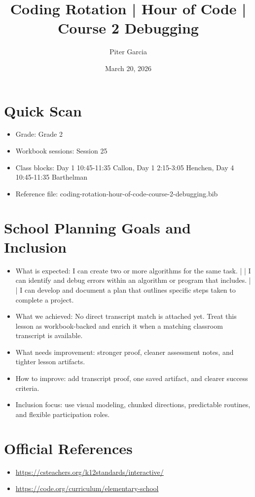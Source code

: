 \documentclass[11pt]{article}
\title{Coding Rotation | Hour of Code | Course 2 Debugging}
\author{Piter Garcia}
\date{March 20, 2026}
\begin{document}
    \maketitle
    \section*{Quick Scan}
    \begin{itemize}[leftmargin=*]
    \item Grade: Grade 2
    \item Workbook sessions: Session 25
    \item Class blocks: Day 1 10:45-11:35 Callon, Day 1 2:15-3:05 Henchen, Day 4 10:45-11:35 Barthelman
    \item Reference file: coding-rotation-hour-of-code-course-2-debugging.bib
    \end{itemize}
    \section*{School Planning Goals and Inclusion}
    \begin{itemize}[leftmargin=*]
    \item What is expected: I can create two or more algorithms for the same task. | | I can identify and debug errors within an algorithm or program that includes. | | I can develop and document a plan that outlines specific steps taken to complete a project.
    \item What we achieved: No direct transcript match is attached yet. Treat this lesson as workbook-backed and enrich it when a matching classroom transcript is available.
    \item What needs improvement: stronger proof, cleaner assessment notes, and tighter lesson artifacts.
    \item How to improve: add transcript proof, one saved artifact, and clearer success criteria.
    \item Inclusion focus: use visual modeling, chunked directions, predictable routines, and flexible participation roles.
    \end{itemize}
    \section*{Official References}
    \begin{itemize}[leftmargin=*]
    \item \url{https://csteachers.org/k12standards/interactive/}
\item \url{https://code.org/curriculum/elementary-school}

    \end{itemize}
    
\end{document}

